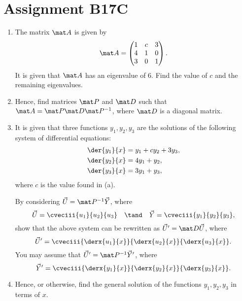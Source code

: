\section{Assignment B17C}

\begin{problem}
    \begin{enumerate}
        \item The matrix $\mat A$ is given by \[\mat A = \begin{pmatrix}1 & c & 3 \\ 4 & 1 & 0 \\ 3 & 0 & 1\end{pmatrix}.\] It is given that $\mat A$ has an eigenvalue of 6. Find the value of $c$ and the remaining eigenvalues.
        \item Hence, find matrices $\mat P$ and $\mat D$ such that $\mat A = \mat P \mat D \mat P^{-1}$, where $\mat D$ is a diagonal matrix.
        \item It is given that three functions $y_1, y_2, y_3$ are the solutions of the following system of differential equations:
        \begin{align*}
            \der{y_1}{x} &= y_1 + c y_2 + 3 y_3,\\
            \der{y_2}{x} &= 4y_1 + y_2,\\
            \der{y_3}{x} &= 3y_1 + y_3,
        \end{align*}
        where $c$ is the value found in (a).

        By considering $\vec U = \mat P^{-1} \vec Y$, where \[\vec U = \cveciii{u_1}{u_2}{u_3} \quad \tand \quad \vec Y = \cveciii{y_1}{y_2}{y_3},\] show that the above system can be rewritten as $\vec U' = \mat D \vec U$, where \[\vec U' = \cveciii{\derx{u_1}{x}}{\derx{u_2}{x}}{\derx{u_3}{x}}.\] You may assume that $\vec U' = \mat P^{-1} \vec Y'$, where \[\vec Y' = \cveciii{\derx{y_1}{x}}{\derx{y_2}{x}}{\derx{y_3}{x}}.\]
        \item Hence, or otherwise, find the general solution of the functions $y_1, y_2, y_3$ in terms of $x$.
    \end{enumerate}
\end{problem}

